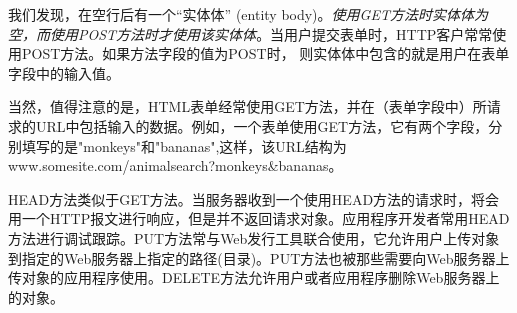     我们发现，在空行后有一个“实体体” (entity body)。\emph{使用GET方法时实体体为空，而使用POST方法时才使用该实体体}。当用户提交表单时，HTTP客户常常使用POST方法。如果方法字段的值为POST时， 则实体体中包含的就是用户在表单字段中的输入值。

    当然，值得注意的是，HTML表单经常使用GET方法，并在（表单字段中）所请求的URL中包括输入的数据。例如，一个表单使用GET方法，它有两个字段，分别填写的是"monkeys"和"bananas",这样，该URL结构为www.somesite.com/animalsearch?monkeys\&bananas。

    HEAD方法类似于GET方法。当服务器收到一个使用HEAD方法的请求时，将会用一个HTTP报文进行响应，但是并不返回请求对象。应用程序开发者常用HEAD方法进行调试跟踪。PUT方法常与Web发行工具联合使用，它允许用户上传对象到指定的Web服务器上指定的路径(目录)。PUT方法也被那些需要向Web服务器上传对象的应用程序使用。DELETE方法允许用户或者应用程序删除Web服务器上的对象。